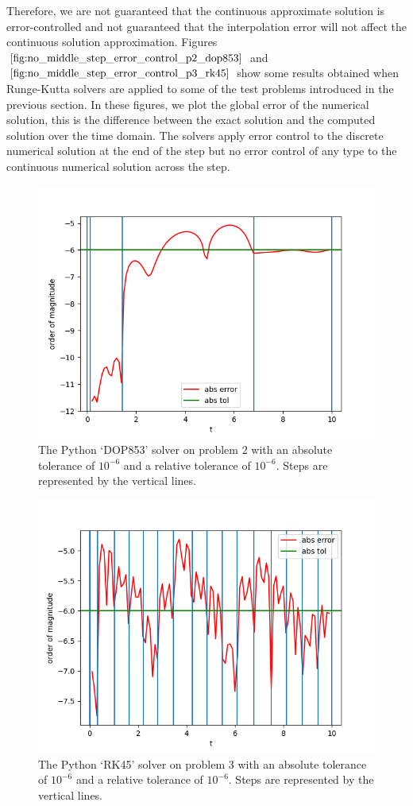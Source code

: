 Therefore, we are not guaranteed that the continuous approximate solution is error-controlled and not guaranteed that the interpolation error will not affect the continuous solution approximation. Figures $\ref{fig:no_middle_step_error_control_p2_dop853}$ and $\ref{fig:no_middle_step_error_control_p3_rk45}$ show some results obtained when Runge-Kutta solvers are applied to some of the test problems introduced in the previous section. In these figures, we plot the global error of the numerical solution, this is the difference between the exact solution and the computed solution over the time domain. The solvers apply error control to the discrete numerical solution at the end of the step but no error control of any type to the continuous numerical solution across the step.

\begin{figure}[H]
\centering
\includegraphics[width=0.7\linewidth]{./figures/no_middle_step_error_control_p2_dop853}
\caption{The Python `DOP853' solver on problem 2 with an absolute tolerance of $10^{-6}$ and a relative tolerance of $10^{-6}$. Steps are represented by the vertical lines.}
\label{fig:no_middle_step_error_control_p2_dop853}
\end{figure}

\begin{figure}[H]
\centering
\includegraphics[width=0.7\linewidth]{./figures/no_middle_step_error_control_p3_rk45}
\caption{The Python `RK45' solver on problem 3 with an absolute tolerance of $10^{-6}$ and a relative tolerance of $10^{-6}$. Steps are represented by the vertical lines.}
\label{fig:no_middle_step_error_control_p3_rk45}
\end{figure}

